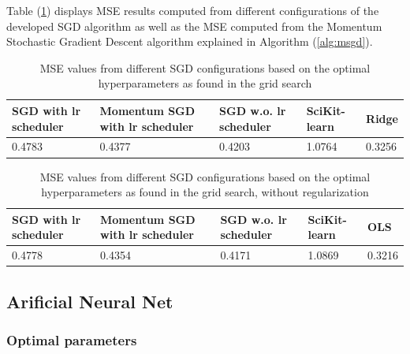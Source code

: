 \documentclass
[twocolumn,
secnumarabic,
nobibnotes,
aps,
prl,
reprint,
groupedaddress,
amsmath,
amssymb
]{revtex4-2}
\begin{document}
Table (\ref{tab:a_mse}) displays MSE results computed from different configurations of the developed SGD algorithm as well as the MSE computed from the Momentum Stochastic Gradient Descent algorithm explained in Algorithm (\ref{alg:msgd}).

\begin{table}
  \caption{\label{tab:a_mse}MSE values from different SGD configurations based on the optimal hyperparameters as found in the grid search}
  \begin{ruledtabular}
    \begin{tabular}{lllll}
      SGD with lr scheduler & Momentum SGD with lr scheduler & SGD w.o. lr scheduler & SciKit-learn & Ridge  \\
      \hline
      0.4783                & 0.4377                         & 0.4203                & 1.0764       & 0.3256 \\
    \end{tabular}
  \end{ruledtabular}
\end{table}

\begin{table}
  \caption{\label{tab:a_mse_lrlmb}MSE values from different SGD configurations based on the optimal hyperparameters as found in the grid search, without regularization}
  \begin{ruledtabular}
    \begin{tabular}{lllll}
      SGD with lr scheduler & Momentum SGD with lr scheduler & SGD w.o. lr scheduler & SciKit-learn & OLS    \\
      \hline
      0.4778                & 0.4354                         & 0.4171                & 1.0869       & 0.3216 \\
    \end{tabular}
  \end{ruledtabular}
\end{table}

\subsection{Arificial Neural Net}


\subsubsection{Optimal parameters}
\end{document}
